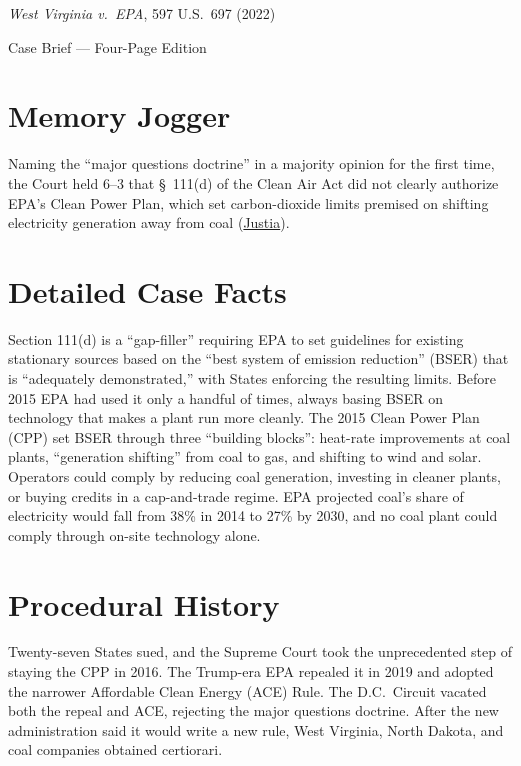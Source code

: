 \documentclass[12pt]{article}
\begin{document}
\begin{center}
{\LARGE \textit{West Virginia v.\ EPA}, 597 U.S.\ 697 (2022)\par}
\vspace{0.8em}
{\large Case Brief --- Four-Page Edition\par}
\end{center}
\vspace{1em}

\section{Memory Jogger}

Naming the ``major questions doctrine'' in a majority opinion for the first time, the Court held 6--3 that \S~111(d) of the Clean Air Act did not clearly authorize EPA's Clean Power Plan, which set carbon-dioxide limits premised on shifting electricity generation away from coal (\href{https://supreme.justia.com/cases/federal/us/597/20-1530/}{Justia}).

\section{Detailed Case Facts}

Section 111(d) is a ``gap-filler'' requiring EPA to set guidelines for existing stationary sources based on the ``best system of emission reduction'' (BSER) that is ``adequately demonstrated,'' with States enforcing the resulting limits. Before 2015 EPA had used it only a handful of times, always basing BSER on technology that makes a plant run more cleanly. The 2015 Clean Power Plan (CPP) set BSER through three ``building blocks'': heat-rate improvements at coal plants, ``generation shifting'' from coal to gas, and shifting to wind and solar. Operators could comply by reducing coal generation, investing in cleaner plants, or buying credits in a cap-and-trade regime. EPA projected coal's share of electricity would fall from 38\% in 2014 to 27\% by 2030, and no coal plant could comply through on-site technology alone.

\section{Procedural History}

Twenty-seven States sued, and the Supreme Court took the unprecedented step of staying the CPP in 2016. The Trump-era EPA repealed it in 2019 and adopted the narrower Affordable Clean Energy (ACE) Rule. The D.C.\ Circuit vacated both the repeal and ACE, rejecting the major questions doctrine. After the new administration said it would write a new rule, West Virginia, North Dakota, and coal companies obtained certiorari.
\end{document}
